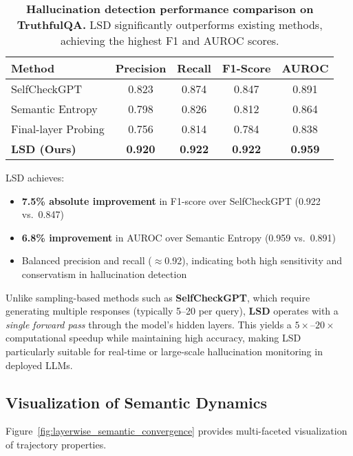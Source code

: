 \documentclass[11pt]{article}
\begin{document}
\begin{table}[h!]
\centering
\caption{\textbf{Hallucination detection performance comparison on TruthfulQA.} LSD significantly outperforms existing methods, achieving the highest F1 and AUROC scores.}
\label{tab:detection_performance}
\begin{tabular}{lcccc}
\toprule
\textbf{Method} & \textbf{Precision} & \textbf{Recall} & \textbf{F1-Score} & \textbf{AUROC} \\
\midrule
SelfCheckGPT & 0.823 & 0.874 & 0.847 & 0.891 \\
Semantic Entropy & 0.798 & 0.826 & 0.812 & 0.864 \\
Final-layer Probing & 0.756 & 0.814 & 0.784 & 0.838 \\
\midrule
\textbf{LSD (Ours)} & \textbf{0.920} & \textbf{0.922} & \textbf{0.922} & \textbf{0.959} \\
\bottomrule
\end{tabular}
\end{table}

\noindent
LSD achieves:
\begin{itemize}[leftmargin=*]
    \item \textbf{7.5\% absolute improvement} in F1-score over SelfCheckGPT (0.922 vs.\ 0.847)
    \item \textbf{6.8\% improvement} in AUROC over Semantic Entropy (0.959 vs.\ 0.891)
    \item Balanced precision and recall ($\approx$0.92), indicating both high sensitivity and conservatism in hallucination detection
\end{itemize}

Unlike sampling-based methods such as \textbf{SelfCheckGPT}, which require generating multiple responses (typically 5--20 per query), \textbf{LSD} operates with a \emph{single forward pass} through the model’s hidden layers. This yields a $5\times$--$20\times$ computational speedup while maintaining high accuracy, making LSD particularly suitable for real-time or large-scale hallucination monitoring in deployed LLMs.

\subsection{Visualization of Semantic Dynamics}

Figure~\ref{fig:layerwise_semantic_convergence} provides multi-faceted visualization of trajectory properties.
\end{document}
